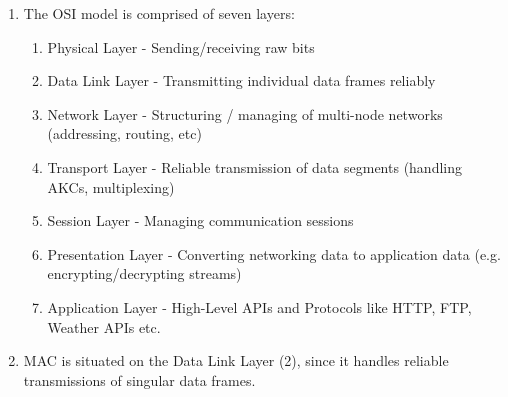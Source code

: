 
    \begin{enumerate}
        \item The OSI model is comprised of seven layers: \begin{enumerate}[label=Layer \arabic*:,leftmargin=*]
            \item Physical Layer - Sending/receiving raw bits
            \item Data Link Layer - Transmitting individual data frames reliably
            \item Network Layer - Structuring / managing of multi-node networks (addressing, routing, etc)
            \item Transport Layer - Reliable transmission of data segments (handling AKCs, multiplexing)
            \item Session Layer - Managing communication sessions
            \item Presentation Layer - Converting networking data to application data (e.g. encrypting/decrypting streams)
            \item Application Layer - High-Level APIs and Protocols like HTTP, FTP, Weather APIs etc.
        \end{enumerate}

        \item MAC is situated on the Data Link Layer (2), since it handles reliable transmissions of singular data frames. 
    \end{enumerate}

    
